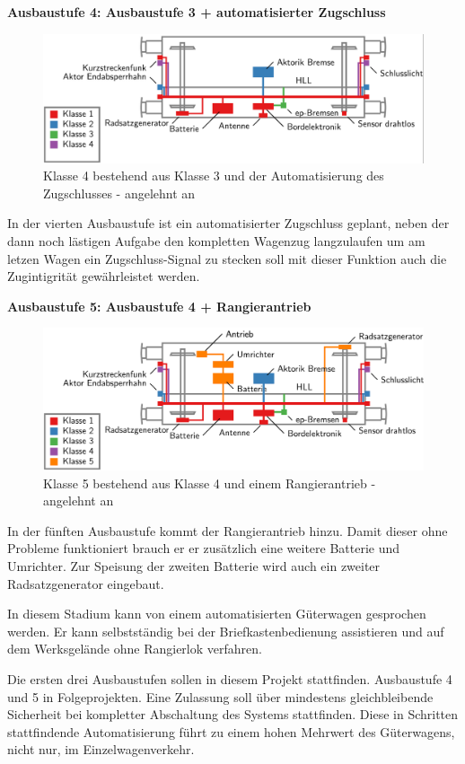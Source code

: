 \textbf{Ausbaustufe 4: Ausbaustufe 3 + automatisierter Zugschluss}\par
\begin{figure}[htbp] 
    \includegraphics[width=\textwidth]{Bilder/Ausbaustufen_4.PNG}
    \caption{Klasse 4 bestehend aus Klasse 3 und der Automatisierung des Zugschlusses - angelehnt an \cite{Ausbaustufen}}
    \label{fig:Klasse4}
\end{figure} 
In der vierten Ausbaustufe ist ein automatisierter Zugschluss geplant, neben der dann noch lästigen Aufgabe den kompletten Wagenzug langzulaufen um am letzen Wagen ein Zugschluss-Signal zu stecken soll mit dieser Funktion auch die Zugintigrität gewährleistet werden.\par
\textbf{Ausbaustufe 5: Ausbaustufe 4 + Rangierantrieb}\par
\begin{figure}[htbp] 
    \includegraphics[width=\textwidth]{Bilder/Ausbaustufen_5.PNG}
    \caption{Klasse 5 bestehend aus Klasse 4 und einem Rangierantrieb - angelehnt an \cite{Ausbaustufen}}
    \label{fig:Klasse5}
\end{figure} 
In der fünften Ausbaustufe kommt der Rangierantrieb hinzu. Damit dieser ohne Probleme funktioniert brauch er er zusätzlich eine weitere Batterie und Umrichter. Zur Speisung der zweiten Batterie wird auch ein zweiter Radsatzgenerator eingebaut.\par
In diesem Stadium kann von einem automatisierten Güterwagen gesprochen werden. Er kann selbstständig bei der Briefkastenbedienung assistieren und auf dem Werksgelände ohne Rangierlok verfahren.\par
Die ersten drei Ausbaustufen sollen in diesem Projekt stattfinden. Ausbaustufe 4 und 5 in Folgeprojekten. Eine Zulassung soll über mindestens gleichbleibende Sicherheit bei kompletter Abschaltung des Systems stattfinden. Diese in Schritten stattfindende Automatisierung führt zu einem hohen Mehrwert des Güterwagens, nicht nur, im Einzelwagenverkehr.
